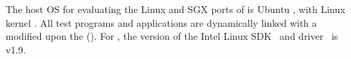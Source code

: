 The host OS for evaluating the Linux and SGX ports of \graphene{} is Ubuntu \ubuntuversion, with Linux kernel \linuxversion{}.
All test programs and applications are dynamically linked
with a modified \glibc{} \glibcversion{} upon the 
\graphene{} \libos{} (\thelibos{}).
For \graphenesgx{},
the version of
the Intel \sgx{} Linux SDK~\cite{intel-sgx-linux-sdk} and driver~\cite{intel-sgx-linux-driver} is v1.9.
